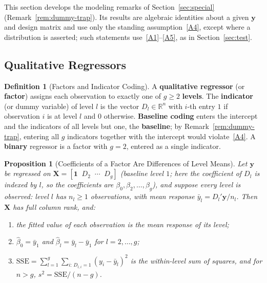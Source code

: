 \documentclass[14pt]{extarticle}
\theoremstyle{plain}
\newtheorem{proposition}[theorem]{Proposition}
\theoremstyle{definition}
\newtheorem{definition}[theorem]{Definition}
\theoremstyle{remark}
\newcommand{\SSE}{\mathrm{SSE}}
\newcommand{\bX}{\mathbf{X}}
\newcommand{\by}{\mathbf{y}}
\newcommand{\bone}{\mathbf{1}}
\newcommand{\Real}{\mathbb{R}}
\begin{document}
This section develops the modeling remarks of Section~\ref{sec:special} (Remark~\ref{rem:dummy-trap}). Its results are algebraic identities about a given $\by$ and design matrix and use only the standing assumption~\ref{A4}, except where a distribution is asserted; such statements use~\ref{A1}--\ref{A5}, as in Section~\ref{sec:test}.

\subsection{Qualitative Regressors}

\begin{definition}[Factors and Indicator Coding]\label{def:factor}
A \textbf{qualitative regressor} (or \textbf{factor}) assigns each observation to exactly one of $g \geqslant 2$ \textbf{levels}. The \textbf{indicator} (or dummy variable) of level $l$ is the vector $D_l \in \Real^n$ with $i$-th entry $1$ if observation $i$ is at level $l$ and $0$ otherwise. \textbf{Baseline coding} enters the intercept and the indicators of all levels but one, the \textbf{baseline}; by Remark~\ref{rem:dummy-trap}, entering all $g$ indicators together with the intercept would violate~\ref{A4}. A \textbf{binary} regressor is a factor with $g = 2$, entered as a single indicator.
\end{definition}

\begin{proposition}[Coefficients of a Factor Are Differences of Level Means]\label{prop:level-means}
Let $\by$ be regressed on $\bX = [\bone \;\; D_2 \;\; \cdots \;\; D_g]$ (baseline level $1$; here the coefficient of $D_l$ is indexed by $l$, so the coefficients are $\beta_0, \beta_2, \ldots, \beta_g$), and suppose every level is observed: level $l$ has $n_l \geqslant 1$ observations, with mean response $\bar y_l = D_l'\by/n_l$. Then $\bX$ has full column rank, and:
\begin{enumerate}[label=\textup{(\roman*)}]
\item the fitted value of each observation is the mean response of its level;
\item $\hat\beta_0 = \bar y_1$ and $\hat\beta_l = \bar y_l - \bar y_1$ for $l = 2, \ldots, g$;
\item $\SSE = \sum_{l=1}^g\sum_{i:\,D_{l,i} = 1}(y_i - \bar y_l)^2$ is the within-level sum of squares, and for $n > g$, $s^2 = \SSE/(n-g)$.
\end{enumerate}
\end{proposition}
\end{document}

